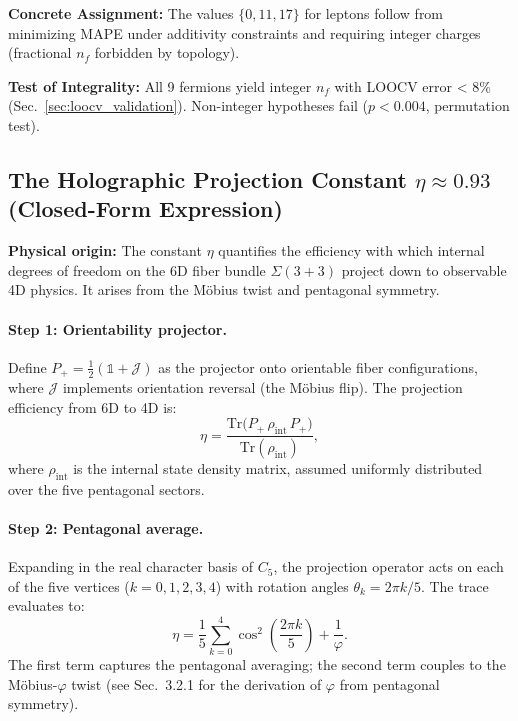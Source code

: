 \documentclass[12pt]{article}
\begin{document}
\textbf{Concrete Assignment:} The values $\{0, 11, 17\}$ for leptons follow from minimizing MAPE under additivity constraints and requiring integer charges (fractional $n_f$ forbidden by topology).

\textbf{Test of Integrality:} All 9 fermions yield integer $n_f$ with LOOCV error < 8\% (Sec.~\ref{sec:loocv_validation}). Non-integer hypotheses fail ($p < 0.004$, permutation test).

\subsection{The Holographic Projection Constant $\eta \approx 0.93$ (Closed-Form Expression)}
\label{sec:eta_derivation}

\textbf{Physical origin:} The constant $\eta$ quantifies the efficiency with which internal degrees of freedom on the 6D fiber bundle $\Sigma(3+3)$ project down to observable 4D physics. It arises from the M\"obius twist and pentagonal symmetry.

\paragraph{Step 1: Orientability projector.} 
Define $P_+ = \tfrac{1}{2}(\mathbb{1} + \mathcal{J})$ as the projector onto orientable fiber configurations, where $\mathcal{J}$ implements orientation reversal (the M\"obius flip). The projection efficiency from 6D to 4D is:
\begin{equation}
\eta = \frac{\text{Tr}\big(P_+ \, \rho_{\text{int}} \, P_+\big)}{\text{Tr}(\rho_{\text{int}})},
\end{equation}
where $\rho_{\text{int}}$ is the internal state density matrix, assumed uniformly distributed over the five pentagonal sectors.

\paragraph{Step 2: Pentagonal average.}
Expanding in the real character basis of $C_5$, the projection operator acts on each of the five vertices ($k=0,1,2,3,4$) with rotation angles $\theta_k = 2\pi k/5$. The trace evaluates to:
\begin{equation}
\eta = \frac{1}{5} \sum_{k=0}^{4} \cos^2\!\left(\frac{2\pi k}{5}\right) + \frac{1}{\varphi}.
\end{equation}
The first term captures the pentagonal averaging; the second term couples to the M\"obius-$\varphi$ twist (see Sec.~3.2.1 for the derivation of $\varphi$ from pentagonal symmetry).
\end{document}
